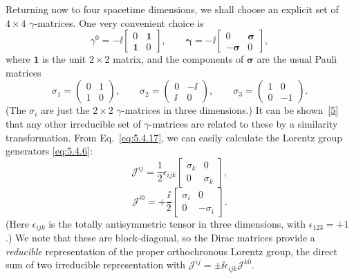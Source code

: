 Returning now to four spacetime dimensions, we shall choose an explicit set of
$4\times4$ $\gamma$-matrices. One very convenient choice is
\begin{equation}
\gamma^0=-\ii\begin{bmatrix}0&\mathbf{1}\\ \mathbf{1}&0\end{bmatrix},
\qquad
\boldsymbol{\gamma}=-\ii\begin{bmatrix}0&\boldsymbol{\sigma}\\
-\boldsymbol{\sigma}&0\end{bmatrix},
\tag{5.4.17}\label{eq:5.4.17}
\end{equation}
where $\mathbf{1}$ is the unit $2\times2$ matrix, and the components of
$\boldsymbol{\sigma}$ are the usual Pauli matrices
\begin{equation}
\sigma_1=\begin{pmatrix}0&1\\1&0\end{pmatrix},\qquad
\sigma_2=\begin{pmatrix}0&-\ii\\\ii&0\end{pmatrix},\qquad
\sigma_3=\begin{pmatrix}1&0\\0&-1\end{pmatrix}.
\tag{5.4.18}\label{eq:5.4.18}
\end{equation}
(The $\sigma_i$ are just the $2\times2$ $\gamma$-matrices in three
dimensions.) It can be shown~\hyperref[ref:5.5]{[5]} that any other irreducible set of
$\gamma$-matrices are related to these by a similarity transformation. From
Eq.~\eqref{eq:5.4.17}, we can easily calculate the Lorentz group generators \eqref{eq:5.4.6}:
\begin{equation}
\mathcal{J}^{ij}=\frac{1}{2}\epsilon_{ijk}
\begin{bmatrix}\sigma_k&0\\0&\sigma_k\end{bmatrix},
\tag{5.4.19}\label{eq:5.4.19}
\end{equation}
\begin{equation}
\mathcal{J}^{i0}=+\frac{\ii}{2}
\begin{bmatrix}\sigma_i&0\\0&-\sigma_i\end{bmatrix}.
\tag{5.4.20}\label{eq:5.4.20}
\end{equation}
(Here $\epsilon_{ijk}$ is the totally antisymmetric tensor in three dimensions,
with $\epsilon_{123}=+1$.) We note that these are block-diagonal, so the Dirac
matrices provide a \emph{reducible} representation of the proper orthochronous
Lorentz group, the direct sum of two irreducible representation with
$\mathcal{J}^{ij}=\mathbin{\pm}\ii\epsilon_{ijk}\mathcal{J}^{k0}$.

